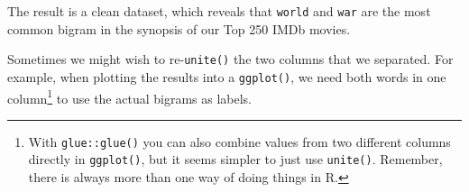 \documentclass[
]{book}
\newenvironment{Shaded}{\begin{snugshade}}{\end{snugshade}}
\newcommand{\AttributeTok}[1]{\textcolor[rgb]{0.77,0.63,0.00}{#1}}
\newcommand{\ConstantTok}[1]{\textcolor[rgb]{0.00,0.00,0.00}{#1}}
\newcommand{\DocumentationTok}[1]{\textcolor[rgb]{0.56,0.35,0.01}{\textbf{\textit{#1}}}}
\newcommand{\FunctionTok}[1]{\textcolor[rgb]{0.00,0.00,0.00}{#1}}
\newcommand{\NormalTok}[1]{#1}
\newcommand{\OtherTok}[1]{\textcolor[rgb]{0.56,0.35,0.01}{#1}}
\newcommand{\SpecialCharTok}[1]{\textcolor[rgb]{0.00,0.00,0.00}{#1}}
\begin{document}
\begin{Shaded}
\end{Shaded}

The result is a clean dataset, which reveals that \texttt{world} and \texttt{war} are the most common bigram in the synopsis of our Top 250 IMDb movies.

Sometimes we might wish to re-\texttt{unite()} the two columns that we separated. For example, when plotting the results into a \texttt{ggplot()}, we need both words in one column\footnote{With \texttt{glue::glue()} you can also combine values from two different columns directly in \texttt{ggplot()}, but it seems simpler to just use \texttt{unite()}. Remember, there is always more than one way of doing things in R.} to use the actual bigrams as labels.
\end{document}
